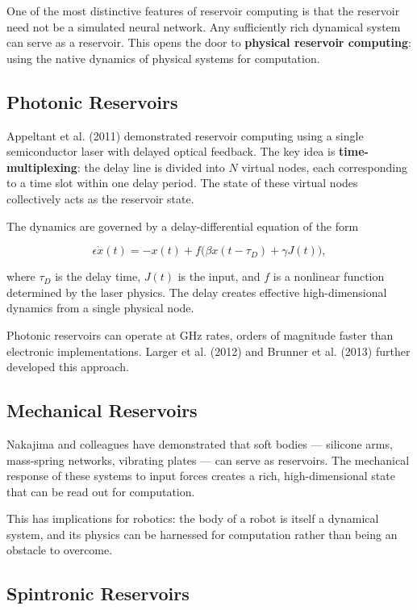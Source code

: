 One of the most distinctive features of reservoir computing is that the reservoir need not be a simulated neural network. Any sufficiently rich dynamical system can serve as a reservoir. This opens the door to \textbf{physical reservoir computing}: using the native dynamics of physical systems for computation.

\subsection{Photonic Reservoirs}\label{sec:17.4.1}

Appeltant et al. (2011) demonstrated reservoir computing using a single semiconductor laser with delayed optical feedback. The key idea is \textbf{time-multiplexing}: the delay line is divided into $N$ virtual nodes, each corresponding to a time slot within one delay period. The state of these virtual nodes collectively acts as the reservoir state.

The dynamics are governed by a delay-differential equation of the form

\[
\epsilon \dot{x}(t) = -x(t) + f\big(\beta x(t - \tau_D) + \gamma J(t)\big),
\]

where $\tau_D$ is the delay time, $J(t)$ is the input, and $f$ is a nonlinear function determined by the laser physics. The delay creates effective high-dimensional dynamics from a single physical node.

Photonic reservoirs can operate at GHz rates, orders of magnitude faster than electronic implementations. Larger et al. (2012) and Brunner et al. (2013) further developed this approach.

\subsection{Mechanical Reservoirs}\label{sec:17.4.2}

Nakajima and colleagues have demonstrated that soft bodies --- silicone arms, mass-spring networks, vibrating plates --- can serve as reservoirs. The mechanical response of these systems to input forces creates a rich, high-dimensional state that can be read out for computation.

This has implications for robotics: the body of a robot is itself a dynamical system, and its physics can be harnessed for computation rather than being an obstacle to overcome.

\subsection{Spintronic Reservoirs}\label{sec:17.4.3}

